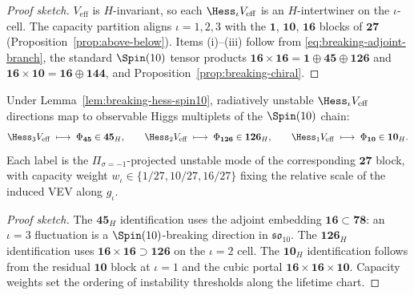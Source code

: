 \begin{proof}[Proof sketch]
$V_{\mathrm{eff}}$ is $H$-invariant, so each $\Hess_\iota V_{\mathrm{eff}}$ is
an $H$-intertwiner on the $\iota$-cell. The capacity partition aligns
$\iota=1,2,3$ with the $\mathbf{1}$, $\mathbf{10}$, $\mathbf{16}$ blocks of
$\mathbf{27}$ (Proposition~\ref{prop:above-below}). Items (i)--(iii) follow
from \eqref{eq:breaking-adjoint-branch}, the standard $\Spin(10)$ tensor
products $\mathbf{16}\times\mathbf{16}=\mathbf{1}\oplus\mathbf{45}\oplus
\mathbf{126}$ and $\mathbf{16}\times\mathbf{10}=\mathbf{16}\oplus\mathbf{144}$,
and Proposition~\ref{prop:breaking-chiral}.
\end{proof}

\begin{proposition}
\label{prop:breaking-higgs-labels}
Under Lemma~\ref{lem:breaking-hess-spin10}, radiatively unstable
$\Hess_\iota V_{\mathrm{eff}}$ directions map to observable Higgs multiplets
of the $\Spin(10)$ chain:
\begin{equation}\label{eq:breaking-higgs-map}
  \Hess_3 V_{\mathrm{eff}}\;\longmapsto\;\Phi_{\mathbf{45}}\in\mathbf{45}_H,
  \qquad
  \Hess_2 V_{\mathrm{eff}}\;\longmapsto\;\Phi_{\mathbf{126}}\in\mathbf{126}_H,
  \qquad
  \Hess_1 V_{\mathrm{eff}}\;\longmapsto\;\Phi_{\mathbf{10}}\in\mathbf{10}_H.
\end{equation}
Each label is the $\Pi_{\sigma=-1}$-projected unstable mode of the
corresponding $\mathbf{27}$ block, with capacity weight
$w_\iota\in\{1/27,10/27,16/27\}$ fixing the relative scale of the induced
VEV along $g_\iota$.
\end{proposition}

\begin{proof}[Proof sketch]
The $\mathbf{45}_H$ identification uses the adjoint embedding
$\mathbf{16}\subset\mathbf{78}$: an $\iota=3$ fluctuation is a
$\Spin(10)$-breaking direction in $\mathfrak{so}_{10}$. The $\mathbf{126}_H$
identification uses $\mathbf{16}\times\mathbf{16}\supset\mathbf{126}$ on the
$\iota=2$ cell. The $\mathbf{10}_H$ identification follows from the residual
$\mathbf{10}$ block at $\iota=1$ and the cubic portal
$\mathbf{16}\times\mathbf{16}\times\mathbf{10}$. Capacity weights set the
ordering of instability thresholds along the lifetime chart.
\end{proof}

